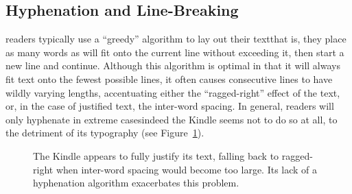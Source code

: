\subsection{Hyphenation and Line-Breaking}
\Ebook{} readers typically use a ``greedy'' algorithm to lay out their text\ed that is, they place as many words as will fit onto the current line without exceeding it, then start a new line and continue. Although this algorithm is optimal in that it will always fit text onto the fewest possible lines, it often causes consecutive lines to have wildly varying lengths, accentuating either the ``ragged-right'' effect of the text, or, in the case of justified text, the inter-word spacing. In general, \ebook{} readers will only hyphenate in extreme cases\ed indeed the Kindle seems not to do so at all, to the detriment of its typography (see Figure~\ref{fig:crapkindle}).

\begin{figure}
    \centering
    \caption[Poor typography on the Kindle]{The Kindle appears to fully justify its text, falling back to ragged-right when inter-word spacing would become too large. Its lack of a hyphenation algorithm exacerbates this problem.}
    \label{fig:crapkindle}
\end{figure}


